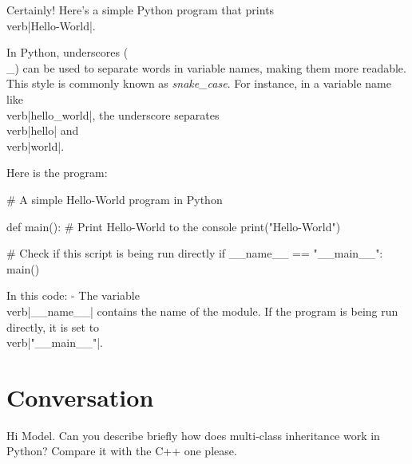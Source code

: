 \begin{result}
Certainly! Here's a simple Python program that prints \\verb|Hello-World|.

\vsp

In Python, underscores (\\_) can be used to separate words in variable names,
making them more readable. This style is commonly known as \textit{snake\_case}.
For instance, in a variable name like \\verb|hello_world|, the underscore
separates \\verb|hello| and \\verb|world|.

Here is the program:

\begin{python}
# A simple Hello-World program in Python

def main():
  # Print Hello-World to the console
  print("Hello-World")

# Check if this script is being run directly
if __name__ == "__main__":
  main()
\end{python}

\vsp

In this code:
- The variable \\verb|__name__| contains the name of the module. If the program
is being run directly, it is set to \\verb|"__main__"|.
\end{result}

\section{Conversation}

\begin{ai}
Hi Model. Can you describe briefly how does multi-class inheritance work in
Python? Compare it with the C++ one please.
\end{ai}

